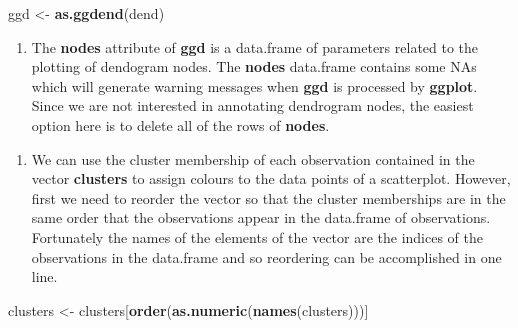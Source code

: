 \documentclass[]{book}
\newenvironment{Shaded}{\begin{snugshade}}{\end{snugshade}}
\newcommand{\KeywordTok}[1]{\textcolor[rgb]{0.13,0.29,0.53}{\textbf{{#1}}}}
\newcommand{\DecValTok}[1]{\textcolor[rgb]{0.00,0.00,0.81}{{#1}}}
\newcommand{\StringTok}[1]{\textcolor[rgb]{0.31,0.60,0.02}{{#1}}}
\newcommand{\NormalTok}[1]{{#1}}
\providecommand{\tightlist}{%
  \setlength{\itemsep}{0pt}\setlength{\parskip}{0pt}}
\theoremstyle{definition}
\theoremstyle{definition}
\theoremstyle{definition}
\theoremstyle{remark}
\begin{document}
\begin{Shaded}
\begin{Highlighting}[]
\NormalTok{ggd <-}\StringTok{ }\KeywordTok{as.ggdend}\NormalTok{(dend)}
\end{Highlighting}
\end{Shaded}

\begin{enumerate}
\def\labelenumi{\arabic{enumi}.}
\setcounter{enumi}{9}
\tightlist
\item
  The \textbf{nodes} attribute of \textbf{ggd} is a data.frame of
  parameters related to the plotting of dendogram nodes. The
  \textbf{nodes} data.frame contains some NAs which will generate
  warning messages when \textbf{ggd} is processed by \textbf{ggplot}.
  Since we are not interested in annotating dendrogram nodes, the
  easiest option here is to delete all of the rows of \textbf{nodes}.
\end{enumerate}

\begin{Shaded}
\end{Shaded}

\begin{enumerate}
\def\labelenumi{\arabic{enumi}.}
\setcounter{enumi}{10}
\tightlist
\item
  We can use the cluster membership of each observation contained in the
  vector \textbf{clusters} to assign colours to the data points of a
  scatterplot. However, first we need to reorder the vector so that the
  cluster memberships are in the same order that the observations appear
  in the data.frame of observations. Fortunately the names of the
  elements of the vector are the indices of the observations in the
  data.frame and so reordering can be accomplished in one line.
\end{enumerate}

\begin{Shaded}
\begin{Highlighting}[]
\NormalTok{clusters <-}\StringTok{ }\NormalTok{clusters[}\KeywordTok{order}\NormalTok{(}\KeywordTok{as.numeric}\NormalTok{(}\KeywordTok{names}\NormalTok{(clusters)))]}
\end{Highlighting}
\end{Shaded}
\end{document}
